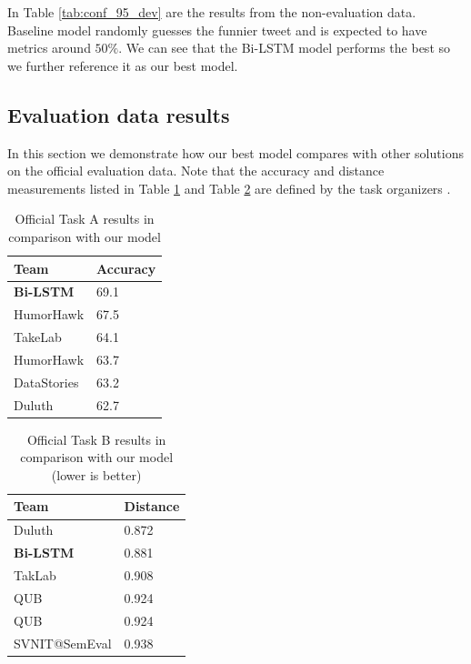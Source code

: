 \documentclass[10pt, a4paper]{article}
\begin{document}
In Table \ref{tab:conf_95_dev} are the results from the non-evaluation data.
Baseline model randomly guesses the funnier tweet and is expected to have
metrics around $50\%$. We can see that the Bi-LSTM model performs the best so
we further reference it as our best model.

\subsection{Evaluation data results}
In this section we demonstrate how our best model compares with other solutions on the official
evaluation data. Note that the accuracy and distance measurements listed in
Table \ref{tab:task_a_official} and Table \ref{tab:task_b_official} are
defined by the task organizers \citep{potash2016hashtagwars}.

\begin{table}
  \caption{Official Task A results in comparison with our model}
 \label{tab:task_a_official}
 \begin{center}
 \begin{tabular}{ll}
 \toprule
     Team & Accuracy\\
 \midrule
     \textbf{Bi-LSTM} & 69.1 \\
     HumorHawk & 67.5 \\
     TakeLab & 64.1\\
     HumorHawk & 63.7\\
     DataStories & 63.2\\
     Duluth & 62.7\\
 \bottomrule
 \end{tabular}
 \end{center}
\end{table}

\begin{table}
    \caption{Official Task B results in comparison with our model (lower is
    better)}
 \label{tab:task_b_official}
 \begin{center}
 \begin{tabular}{ll}
 \toprule
     Team & Distance\\
 \midrule
     Duluth & 0.872 \\
     \textbf{Bi-LSTM} & 0.881 \\
     TakLab & 0.908\\
     QUB & 0.924\\
     QUB & 0.924\\
     SVNIT@SemEval & 0.938\\
 \bottomrule
 \end{tabular}
 \end{center}
\end{table}
\end{document}
